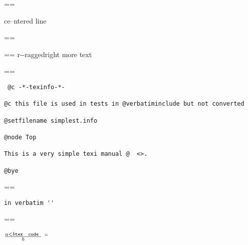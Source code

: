 \documentclass{book}
\makeatletter
\newenvironment{GNUTexinfopreformatted}{%
  \par\GNUTobeylines\obeyspaces\frenchspacing
  \parskip=\z@\parindent=\z@}{}
{\catcode`\^^M=13 \gdef\GNUTobeylines{\catcode`\^^M=13 \def^^M{\null\par}}}
\newenvironment{GNUTexinfoindented}
  {\begin{list}{}{}
  \item\relax}
  {\end{list}}
\makeatother
\begin{document}
\begin{GNUTexinfoindented}
\begin{GNUTexinfopreformatted}
\ttfamily 
\end{GNUTexinfopreformatted}
\begin{center}
ce--ntered line
\end{center}
\begin{GNUTexinfopreformatted}%
\ttfamily 
\end{GNUTexinfopreformatted}
\begin{flushleft}
\begin{GNUTexinfopreformatted}%
\ttfamily r{-}{-}raggedright
more text
\end{GNUTexinfopreformatted}
\end{flushleft}
\begin{GNUTexinfopreformatted}%
\ttfamily 
\end{GNUTexinfopreformatted}
\begin{verbatim}
 @c -*-texinfo-*-

@c this file is used in tests in @verbatiminclude but not converted

@setfilename simplest.info

@node Top

This is a very simple texi manual @  <>.

@bye
\end{verbatim}
\begin{GNUTexinfopreformatted}%
\ttfamily 
\end{GNUTexinfopreformatted}
\begin{verbatim}
in verbatim ''
\end{verbatim}
\begin{GNUTexinfopreformatted}%
\ttfamily 




$\frac{a < b \texttt{tex \hbox{ code }}}{b}$ ``


\end{GNUTexinfopreformatted}
\end{GNUTexinfoindented}
\end{document}
